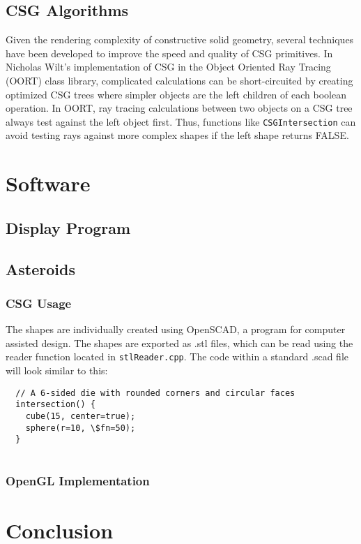 \documentclass[12pt]{article}
\begin{document}
\subsection{CSG Algorithms}
\indent Given the rendering complexity of constructive solid geometry, several techniques have been developed to improve the speed and quality of CSG primitives. In Nicholas Wilt's implementation of CSG in the Object Oriented Ray Tracing (OORT) class library, complicated calculations can be short-circuited by creating optimized CSG trees where simpler objects are the left children of each boolean operation. In OORT, ray tracing calculations between two objects on a CSG tree always test against the left object first. Thus, functions like \texttt{CSGIntersection} can avoid testing rays against more complex shapes if the left shape returns FALSE\cite{raytrace}.
\section{Software}
\subsection{Display Program}

\subsection{Asteroids}
\indent 
\subsubsection{CSG Usage}
\indent The shapes are individually created using OpenSCAD, a program for computer assisted design. The shapes are exported as .stl files, which can be read using the reader function located in \texttt{stlReader.cpp}. The code within a standard .scad file will look similar to this:
\lstset{language=scad}
\begin{lstlisting}
  // A 6-sided die with rounded corners and circular faces
  intersection() {
    cube(15, center=true);
    sphere(r=10, \$fn=50);
  }
  
\end{lstlisting}
\subsubsection{OpenGL Implementation}
\section{Conclusion}
\newpage
\end{document}
